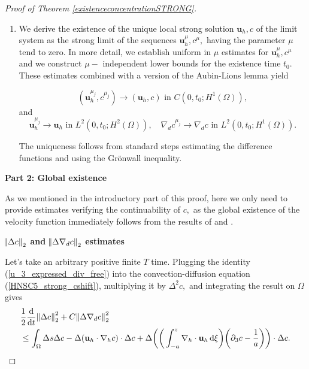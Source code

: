 \documentclass[11pt, a4paper]{article}
\newcommand*\diff{\mathop{}\!\mathrm{d}}
\begin{document}
\begin{proof}[Proof of Theorem \ref{existenceconcentrationSTRONG}]
\begin{enumerate}
\item We derive the existence of the unique local strong solution $\mathbf{u}_h, c$ of the limit system as the strong limit of the sequences $\mathbf{u}_h^\mu, c^\mu,$ having the parameter $\mu$ tend to zero. In more detail, we establish uniform in $\mu$ estimates for $\mathbf{u}_h^\mu, c^\mu$ and we construct $\mu-$ independent lower bounds for the existence time $t_0$. These estimates combined with a version of the Aubin-Lions lemma yield

\begin{equation}
(\mathbf{u}_h^{\mu_j}, c^{\mu_j}) \to (\mathbf{u}_h, c) \text{ in } C(0, t_0; H^1(\Omega)),
\end{equation}
%
and
%
\begin{equation}
\mathbf{u}_h^{\mu_j} \to \mathbf{u}_h \text{ in } L^2(0, t_0; H^2(\Omega)), \quad \nabla_d c^{\mu_j} \to \nabla_d c \text{ in } L^2(0, t_0; H^1(\Omega)).
\end{equation}

The uniqueness follows from standard steps estimating the difference functions and using the Gr\"onwall inequality.

\end{enumerate}

\bigskip

\textbf{Part 2: Global existence}

As we mentioned in the introductory part of this proof, here we only need to provide estimates verifying the continuability of $c,$ as the global existence of the velocity function immediately follows from the results of \cite{li2019primitive} and \cite{petcu2005sobolev}.

\bigskip

\textbf{$\norm{\Delta c}_2$ and $\norm{\Delta \nabla_d c}_2$ estimates}

Let's take an arbitrary positive finite $T$ time. Plugging the identity (\ref{u_3_expressed_div_free}) into the convection-diffusion equation (\ref{HNSC5_strong_cshift}), multiplying it by $\Delta^2 c,$ and integrating the result on $\Omega$ gives
%
\begin{equation} \label{firstformboundc}
\begin{split}
& \frac{1}{2} \frac{\diff}{\diff t} \norm{\Delta c}_2^2 + C \norm{\Delta \nabla_d c}_2^2 \\
& \leq \int_\Omega \Delta s \Delta c - \Delta ( \mathbf{u}_h \cdot \nabla_h c) \cdot \Delta c + \Delta \bigg ( \bigg ( \int_{-a}^z \nabla_h \cdot \mathbf{u}_h \diff \xi \bigg) \bigg ( \partial_3 c - \frac{1}{a} \bigg) \bigg ) \cdot \Delta c.
\end{split}
\end{equation}


\end{proof}
\end{document}
